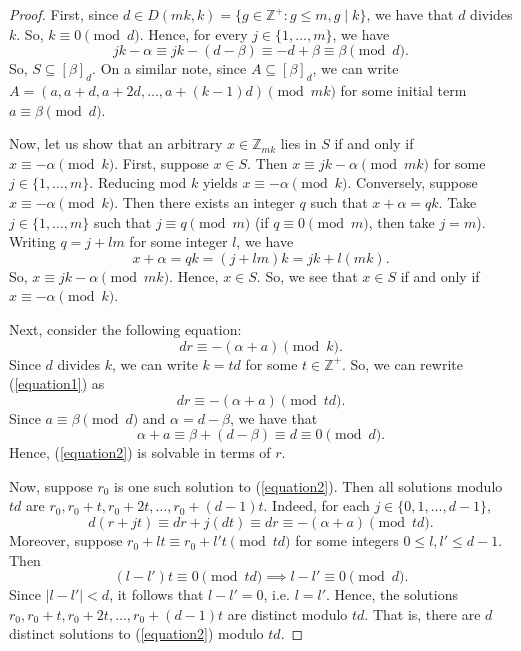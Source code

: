 \documentclass[10pt,a4paper]{amsart}
\begin{document}
\begin{proof}
    First, since $d \in D(mk,k) = \{g \in \mathbb{Z}^+ : g \leq m, g \mid k\}$, we have that $d$ divides $k$. So, $k \equiv 0 \pmod d$. Hence, for every $j \in \{1,\ldots,m\}$, we have \begin{equation*}
        jk -\alpha \equiv jk-(d-\beta) \equiv -d+\beta \equiv \beta \pmod d.
    \end{equation*} So, $S \subseteq [\beta]_d$. On a similar note, since $A \subseteq [\beta]_d$, we can write $A = (a,a+d,a+2d,\ldots,a+(k-1)d) \pmod {mk}$ for some initial term $a \equiv \beta \pmod d$.

    Now, let us show that an arbitrary $x \in \mathbb{Z}_{mk}$ lies in $S$ if and only if $x \equiv -\alpha \pmod k$. First, suppose $x \in S$. Then $x \equiv jk-\alpha \pmod {mk}$ for some $j \in \{1,\ldots,m\}$. Reducing mod $k$ yields $x \equiv -\alpha \pmod k$. Conversely, suppose $x \equiv -\alpha \pmod k$. Then there exists an integer $q$ such that $x+\alpha = qk$. Take $j \in \{1,\ldots,m\}$ such that $j \equiv q \pmod m$ (if $q \equiv 0 \pmod m$, then take $j=m$). Writing $q = j+lm$ for some integer $l$, we have \begin{equation*}
        x+\alpha = qk = (j+lm)k = jk+l(mk).
\end{equation*} So, $x \equiv jk-\alpha \pmod {mk}$. Hence, $x \in S$. So, we see that $x \in S$ if and only if $x \equiv -\alpha \pmod k$.

Next, consider the following equation:\begin{equation}\label{equation1}
    dr \equiv -(\alpha+a) \pmod k.
\end{equation} Since $d$ divides $k$, we can write $k=td$ for some $t \in \mathbb{Z}^+$. So, we can rewrite (\ref{equation1}) as \begin{equation}\label{equation2}
    dr \equiv -(\alpha + a) \pmod {td}.
\end{equation} Since $a \equiv \beta \pmod d$ and $\alpha = d-\beta$, we have that \begin{equation*}
    \alpha+a \equiv \beta +(d-\beta) \equiv d \equiv 0 \pmod d.
\end{equation*} Hence, (\ref{equation2}) is solvable in terms of $r$. 

Now, suppose $r_0$ is one such solution to (\ref{equation2}). Then all solutions modulo $td$ are $r_0,r_0+t,r_0+2t,\ldots,r_0+(d-1)t$. Indeed, for each $j \in \{0,1,\ldots,d-1\}$, \begin{equation*}
    d(r+jt) \equiv dr+j(dt) \equiv dr \equiv -(\alpha+a) \pmod {td}.
\end{equation*} Moreover, suppose $r_0+lt \equiv r_0+l't \pmod {td}$ for some integers $0 \leq l,l' \leq d-1$. Then \begin{equation*}
    (l-l')t \equiv 0 \pmod {td} \implies l-l' \equiv 0 \pmod d.
\end{equation*} Since $|l-l'| < d$, it follows that $l-l' = 0$, i.e. $l=l'$. Hence, the solutions $r_0,r_0+t,r_0+2t,\ldots,r_0+(d-1)t$ are distinct modulo $td$. That is, there are $d$ distinct solutions to (\ref{equation2}) modulo $td$.


\end{proof}
\end{document}
